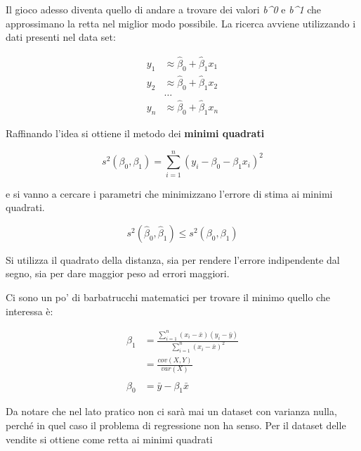 Il gioco adesso diventa quello di andare a trovare dei valori
\emph{b\^{}0} e \emph{b\^{}1} che approssimano la retta nel miglior modo
possibile. La ricerca avviene utilizzando i dati presenti nel data set:


\begin{align*}
	y_1 &\approx \hat{\beta}_0 + \hat{\beta}_1 x_1 \\
	y_2 &\approx \hat{\beta}_0 + \hat{\beta}_1 x_2 \\
	&\ldots \\
	y_n &\approx \hat{\beta}_0 + \hat{\beta}_1 x_n
\end{align*}

Raffinando l'idea si ottiene il metodo dei \textbf{minimi quadrati}

$$
s^2(\beta_0, \beta_1) = \sum\limits_{i=1}^n(y_i - \beta_0 - \beta_1 x_i)^2
$$

e si vanno a cercare i parametri che minimizzano l'errore di stima
ai minimi quadrati.

$$ s^2(\hat{\beta}_0,\hat{\beta}_1) \leq s^2(\beta_0, \beta_1) $$

Si utilizza il quadrato della distanza, sia per rendere l'errore
indipendente dal segno, sia per dare maggior peso ad errori maggiori.

Ci sono un po' di barbatrucchi matematici per trovare il minimo quello
che interessa è:

\begin{align*}
	\beta_1 &= \frac{\sum\limits_{i=1}^{n} (x_i - \bar{x})(y_i - \bar{y})}{ \sum\limits_{i=1}^{n} (x_i - \bar{x})^2} \\
	 &= \frac{cov(X,Y)}{var(X)} \\
	 \: \\
	\beta_0 &= \bar{y} - \beta_1 \bar{x}
\end{align*}

Da notare che nel lato pratico non ci sarà mai un dataset con varianza
nulla, perché in quel caso il problema di regressione non ha senso. Per
il dataset delle vendite si ottiene come retta ai minimi quadrati

